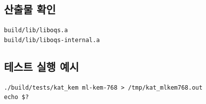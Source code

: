 \subsection{산출물 확인}
\begin{lstlisting}[style=cstyle,caption={주요 정적 라이브러리 산출물}]
build/lib/liboqs.a
build/lib/liboqs-internal.a
\end{lstlisting}

\subsection{테스트 실행 예시}
\begin{lstlisting}[style=cstyle,caption={KAT 기반 KEM 테스트 예시}]
./build/tests/kat_kem ml-kem-768 > /tmp/kat_mlkem768.out
echo $?
\end{lstlisting}
